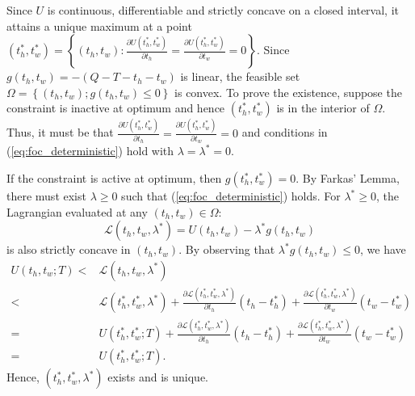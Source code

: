 \documentclass[12pt,a4paper,british]{article}
\makeatletter
\theoremstyle{definition}
\theoremstyle{plain}
\newenvironment{proof}[1][\proofname]{\par
    \normalfont\topsep6\p@\@plus6\p@\relax
    \trivlist
    \itemindent\parindent
    \item[\hskip\labelsep
          \scshape
      #1]\ignorespaces
  }{%
    \endtrivlist\@endpefalse
  }
\providecommand{\proofname}{Proof}
\theoremstyle{plain}
\theoremstyle{plain}
\makeatother
\begin{document}
\begin{proof}
Since $U$ is continuous, differentiable and strictly concave on a closed interval, it attains a unique maximum at a point $\left(t_{h}^{\ast},t_{w}^{\ast}\right)=\left\{ \left(t_{h},t_{w}\right):\frac{\partial U\left(t_{h}^{\ast},t_{w}^{\ast}\right)}{\partial t_{h}}=\frac{\partial U\left(t_{h}^{\ast},t_{w}^{\ast}\right)}{\partial t_{w}}=0\right\} $. Since $g\left(t_{h},t_{w}\right)=-\left(Q-T-t_{h}-t_{w}\right)$ is linear, the feasible set $\Omega=\left\{ \left(t_{h},t_{w}\right);g\left(t_{h},t_{w}\right)\leq0\right\} $ is convex. To prove the existence, suppose the constraint is inactive
at optimum and hence $\left(t_{h}^{\ast},t_{w}^{\ast}\right)$ is in the interior of $\Omega$. Thus, it must be that $\frac{\partial U\left(t_{h}^{\ast},t_{w}^{\ast}\right)}{\partial t_{h}}=\frac{\partial U\left(t_{h}^{\ast},t_{w}^{\ast}\right)}{\partial t_{w}}=0$
and conditions in (\ref{eq:foc_deterministic}) hold with $\lambda=\lambda^{\ast}=0$.

If the constraint is active at optimum, then $g\left(t_{h}^{\ast},t_{w}^{\ast}\right)=0$. By Farkas' Lemma, there must exist $\lambda\geq0$ such that (\ref{eq:foc_deterministic}) holds. For $\lambda^{\ast}\geq0$, the Lagrangian evaluated at any $\left(t_{h},t_{w}\right)\in\Omega$: 
\begin{equation*}
\mathcal{L}\left(t_{h},t_{w},\lambda^{\ast}\right)=U\left(t_{h},t_{w}\right)-\lambda^{\ast}g\left(t_{h},t_{w}\right)
\end{equation*}
is also strictly concave in $\left(t_{h},t_{w}\right)$. By observing that $\lambda^{\ast}g\left(t_{h},t_{w}\right)\leq0$, we have
\begin{align*}
U\left(t_{h},t_{w};T\right)< & \mathcal{L}\left(t_{h},t_{w},\lambda^{\ast}\right)\\
< & \mathcal{L}\left(t_{h}^{\ast},t_{w}^{\ast},\lambda^{\ast}\right)+\frac{\partial\mathcal{L}\left(t_{h}^{\ast},t_{w}^{\ast},\lambda^{\ast}\right)}{\partial t_{h}}\left(t_{h}-t_{h}^{\ast}\right)+\frac{\partial\mathcal{L}\left(t_{h}^{\ast},t_{w}^{\ast},\lambda^{\ast}\right)}{\partial t_{w}}\left(t_{w}-t_{w}^{\ast}\right)\\
= & U\left(t_{h}^{\ast},t_{w}^{\ast};T\right)+\frac{\partial\mathcal{L}\left(t_{h}^{\ast},t_{w}^{\ast},\lambda^{\ast}\right)}{\partial t_{h}}\left(t_{h}-t_{h}^{\ast}\right)+\frac{\partial\mathcal{L}\left(t_{h}^{\ast},t_{w}^{\ast},\lambda^{\ast}\right)}{\partial t_{w}}\left(t_{w}-t_{w}^{\ast}\right)\\
= & U\left(t_{h}^{\ast},t_{w}^{\ast};T\right).
\end{align*}
Hence, $\left(t_{h}^{\ast},t_{w}^{\ast},\lambda^{\ast}\right)$ exists and is unique.
\end{proof}
\end{document}
